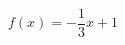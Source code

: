 \hspace*{2mm}\begin{minipage}[t]{\dimexpr\linewidth-2mm\relax}\vspace{0pt}
$f(x)=-\dfrac{1}{3}x+1$\end{minipage}
